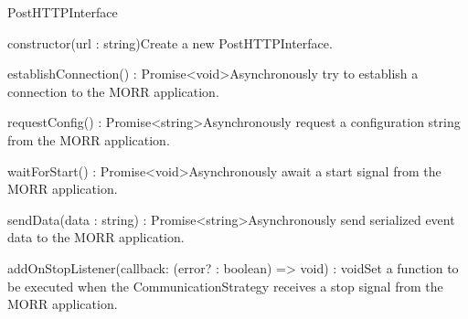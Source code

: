 \begin{class}{PostHTTPInterface}




\begin{constructors}
\begin{constructor}{constructor(url : string)}{Create a new PostHTTPInterface.}
\begin{parameters}
\end{parameters}
\end{constructor}
\end{constructors}
\begin{methods}
\begin{method}{establishConnection() : Promise<void>}{Asynchronously try to establish a connection to the MORR application.}
\end{method}
\begin{method}{requestConfig() : Promise<string>}{Asynchronously request a configuration string from the MORR application.}
\end{method}
\begin{method}{waitForStart() : Promise<void>}{Asynchronously await a start signal from the MORR application.}
\end{method}
\begin{method}{sendData(data : string) : Promise<string>}{Asynchronously send serialized event data to the MORR application.}
\end{method}
\begin{method}{addOnStopListener(callback: (error? : boolean) => void) : void}{Set a function to be executed when the CommunicationStrategy receives a stop signal from the MORR application.}
\end{method}
\end{methods}
\end{class}